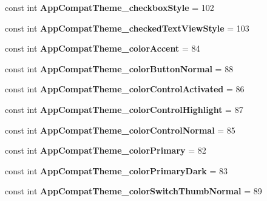 \begin{DoxyCompactItemize}
const int {\bfseries App\+Compat\+Theme\+\_\+checkbox\+Style} = 102
\item 
\mbox{\label{classXaria_1_1Resource_1_1Styleable_ad4c654df6a683dbe1aef4b31a3c22cb0}} 
const int {\bfseries App\+Compat\+Theme\+\_\+checked\+Text\+View\+Style} = 103
\item 
\mbox{\label{classXaria_1_1Resource_1_1Styleable_aa54781abe933636eeb23f691f73a2f49}} 
const int {\bfseries App\+Compat\+Theme\+\_\+color\+Accent} = 84
\item 
\mbox{\label{classXaria_1_1Resource_1_1Styleable_a761bb5c0610d3aaa1206373b707b5160}} 
const int {\bfseries App\+Compat\+Theme\+\_\+color\+Button\+Normal} = 88
\item 
\mbox{\label{classXaria_1_1Resource_1_1Styleable_a4542e41dd39a823bac4290b5eb4bfc2a}} 
const int {\bfseries App\+Compat\+Theme\+\_\+color\+Control\+Activated} = 86
\item 
\mbox{\label{classXaria_1_1Resource_1_1Styleable_a06d453085fc9d24848e1d1e7e05fdf62}} 
const int {\bfseries App\+Compat\+Theme\+\_\+color\+Control\+Highlight} = 87
\item 
\mbox{\label{classXaria_1_1Resource_1_1Styleable_abc79d6ada63448ed29af0f9268d71ac7}} 
const int {\bfseries App\+Compat\+Theme\+\_\+color\+Control\+Normal} = 85
\item 
\mbox{\label{classXaria_1_1Resource_1_1Styleable_a29e1dbdf3352ebc56864fd482b1de71a}} 
const int {\bfseries App\+Compat\+Theme\+\_\+color\+Primary} = 82
\item 
\mbox{\label{classXaria_1_1Resource_1_1Styleable_a2501a334fa325a58c3302e6d2104ceef}} 
const int {\bfseries App\+Compat\+Theme\+\_\+color\+Primary\+Dark} = 83
\item 
\mbox{\label{classXaria_1_1Resource_1_1Styleable_af16b4aac2b49d1c530e8dfec8d3c1f69}} 
const int {\bfseries App\+Compat\+Theme\+\_\+color\+Switch\+Thumb\+Normal} = 89

\end{DoxyCompactItemize}
